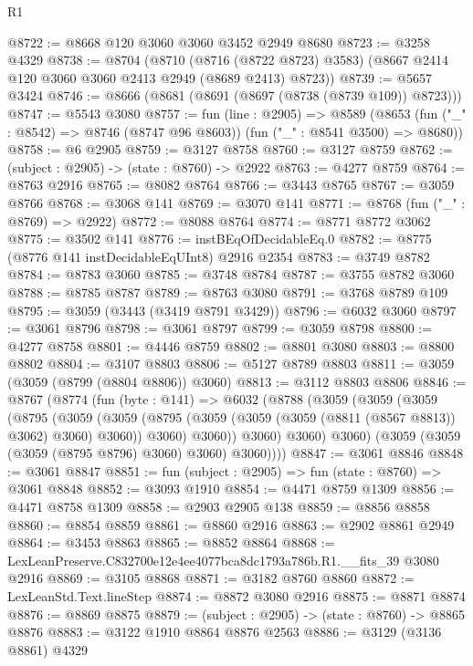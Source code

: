 \begin{lexlean}{R1}
\begin{coremodule}
@8722 := @8668 @120 @3060 @3060 @3452 @2949 @8680
@8723 := @3258 @4329
@8738 := @8704
    (@8710
      (@8716 (@8722 @8723) @3583)
      (@8667 @2414 @120 @3060 @3060 @2413 @2949 (@8689 @2413) @8723))
@8739 := @5657 @3424
@8746 := @8666 (@8681 (@8691 (@8697 (@8738 (@8739 @109)) @8723)))
@8747 := @5543 @3080
@8757 := fun (line : @2905) =>
  @8589 (@8653 (fun ("_" : @8542) => @8746 (@8747 @96 @8603)) (fun ("_" : @8541 @3500) => @8680))
@8758 := @6 @2905
@8759 := @3127 @8758
@8760 := @3127 @8759
@8762 := (subject : @2905) -> (state : @8760) -> @2922
@8763 := @4277 @8759
@8764 := @8763 @2916
@8765 := @8082 @8764
@8766 := @3443 @8765
@8767 := @3059 @8766
@8768 := @3068 @141
@8769 := @3070 @141
@8771 := @8768 (fun ("_" : @8769) => @2922)
@8772 := @8088 @8764
@8774 := @8771 @8772 @3062
@8775 := @3502 @141
@8776 := instBEqOfDecidableEq.{0}
@8782 := @8775 (@8776 @141 instDecidableEqUInt8) @2916 @2354
@8783 := @3749 @8782
@8784 := @8783 @3060
@8785 := @3748 @8784
@8787 := @3755 @8782 @3060
@8788 := @8785 @8787
@8789 := @8763 @3080
@8791 := @3768 @8789 @109
@8795 := @3059 (@3443 (@3419 @8791 @3429))
@8796 := @6032 @3060
@8797 := @3061 @8796
@8798 := @3061 @8797
@8799 := @3059 @8798
@8800 := @4277 @8758
@8801 := @4446 @8759
@8802 := @8801 @3080
@8803 := @8800 @8802
@8804 := @3107 @8803
@8806 := @5127 @8789 @8803
@8811 := @3059 (@3059 (@8799 (@8804 @8806)) @3060)
@8813 := @3112 @8803 @8806
@8846 := @8767
    (@8774
      (fun (byte : @141) =>
      @6032
        (@8788
          (@3059
            (@3059
              (@3059
                (@8795
                  (@3059
                    (@3059
                      (@8795 (@3059 (@3059 (@3059 (@8811 (@8567 @8813)) @3062) @3060) @3060))
                      @3060)
                    @3060))
                @3060)
              @3060)
            @3060)
          (@3059 (@3059 (@3059 (@8795 @8796) @3060) @3060) @3060))))
@8847 := @3061 @8846
@8848 := @3061 @8847
@8851 := fun (subject : @2905) => fun (state : @8760) => @3061 @8848
@8852 := @3093 @1910
@8854 := @4471 @8759 @1309
@8856 := @4471 @8758 @1309
@8858 := @2903 @2905 @138
@8859 := @8856 @8858
@8860 := @8854 @8859
@8861 := @8860 @2916
@8863 := @2902 @8861 @2949
@8864 := @3453 @8863
@8865 := @8852 @8864
@8868 := LexLeanPreserve.C832700e12e4ee4077bca8dc1793a786b.R1.__fits_39 @3080 @2916
@8869 := @3105 @8868
@8871 := @3182 @8760 @8860
@8872 := LexLeanStd.Text.lineStep
@8874 := @8872 @3080 @2916
@8875 := @8871 @8874
@8876 := @8869 @8875
@8879 := (subject : @2905) -> (state : @8760) -> @8865 @8876
@8883 := @3122 @1910 @8864 @8876 @2563
@8886 := @3129 (@3136 @8861) @4329

\end{coremodule}
\end{lexlean}
